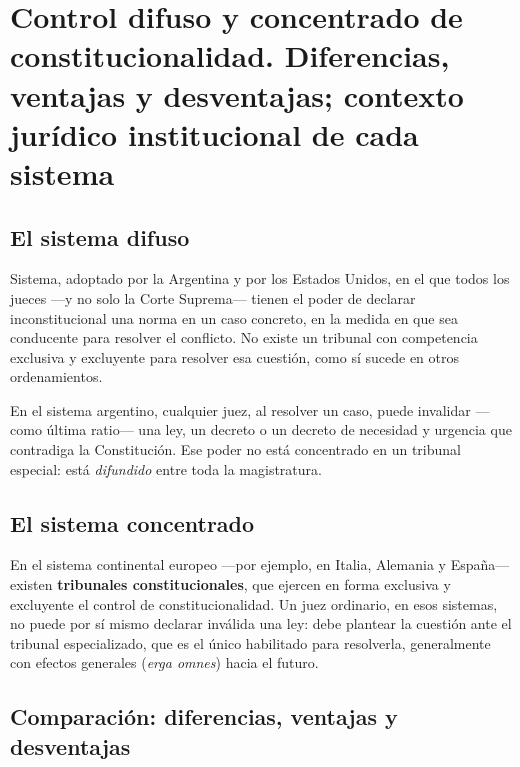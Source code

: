 \documentclass[12pt,oneside]{book}
\begin{document}
\chapter{Control difuso y concentrado de constitucionalidad. Diferencias, ventajas y desventajas; contexto jurídico institucional de cada sistema}
\label{cap:p3}

\section{El sistema difuso}

\begin{defbox}
Sistema, adoptado por la Argentina y por los Estados Unidos, en el que todos los
jueces —y no solo la Corte Suprema— tienen el poder de declarar inconstitucional
una norma en un caso concreto, en la medida en que sea conducente para resolver el
conflicto. No existe un tribunal con competencia exclusiva y excluyente para
resolver esa cuestión, como sí sucede en otros ordenamientos.
\end{defbox}

En el sistema argentino, cualquier juez, al resolver un caso, puede invalidar
—como última ratio— una ley, un decreto o un decreto de necesidad y urgencia que
contradiga la Constitución. Ese poder no está concentrado en un tribunal especial:
está \textit{difundido} entre toda la magistratura.

\section{El sistema concentrado}

En el sistema continental europeo —por ejemplo, en Italia, Alemania y España—
existen \textbf{tribunales constitucionales}, que ejercen en forma exclusiva y
excluyente el control de constitucionalidad. Un juez ordinario, en esos sistemas,
no puede por sí mismo declarar inválida una ley: debe plantear la cuestión ante el
tribunal especializado, que es el único habilitado para resolverla, generalmente
con efectos generales (\textit{erga omnes}) hacia el futuro.

\section{Comparación: diferencias, ventajas y desventajas}
\end{document}
